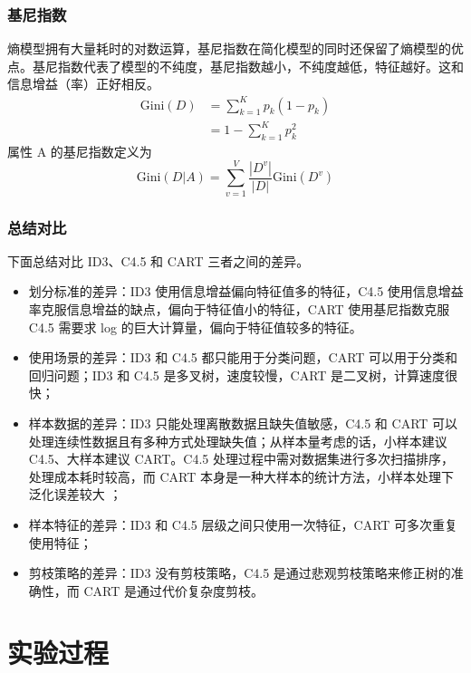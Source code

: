 \documentclass[12pt,AutoFakeBold]{article}
\begin{document}
\subsubsection{基尼指数}

熵模型拥有大量耗时的对数运算，基尼指数在简化模型的同时还保留了熵模型的优点。基尼指数代表了模型的不纯度，基尼指数越小，不纯度越低，特征越好。这和信息增益（率）正好相反。
%
\begin{equation}
\begin{aligned}
\mathrm{Gini}(D) &= \sum_{k=1}^Kp_k(1-p_k) \\
 &= 1-\sum_{k=1}^{K}p_k^2
\end{aligned}
\end{equation}
%
属性 A 的基尼指数定义为
%
\begin{equation}
\mathrm{Gini}(D|A)=\sum_{v=1}^V\frac{|D^v|}{|D|}\mathrm{Gini}(D^v)
\end{equation}
%

\subsubsection{总结对比}

下面总结对比 ID3、C4.5 和 CART 三者之间的差异。

\begin{itemize}
\item 划分标准的差异：ID3 使用信息增益偏向特征值多的特征，C4.5 使用信息增益率克服信息增益的缺点，偏向于特征值小的特征，CART 使用基尼指数克服 C4.5 需要求 log 的巨大计算量，偏向于特征值较多的特征。
\item 使用场景的差异：ID3 和 C4.5 都只能用于分类问题，CART 可以用于分类和回归问题；ID3 和 C4.5 是多叉树，速度较慢，CART 是二叉树，计算速度很快；
\item 样本数据的差异：ID3 只能处理离散数据且缺失值敏感，C4.5 和 CART 可以处理连续性数据且有多种方式处理缺失值；从样本量考虑的话，小样本建议 C4.5、大样本建议 CART。C4.5 处理过程中需对数据集进行多次扫描排序，处理成本耗时较高，而 CART 本身是一种大样本的统计方法，小样本处理下泛化误差较大 ；
\item 样本特征的差异：ID3 和 C4.5 层级之间只使用一次特征，CART 可多次重复使用特征；
\item 剪枝策略的差异：ID3 没有剪枝策略，C4.5 是通过悲观剪枝策略来修正树的准确性，而 CART 是通过代价复杂度剪枝。
\end{itemize}

\section{实验过程}
\end{document}
